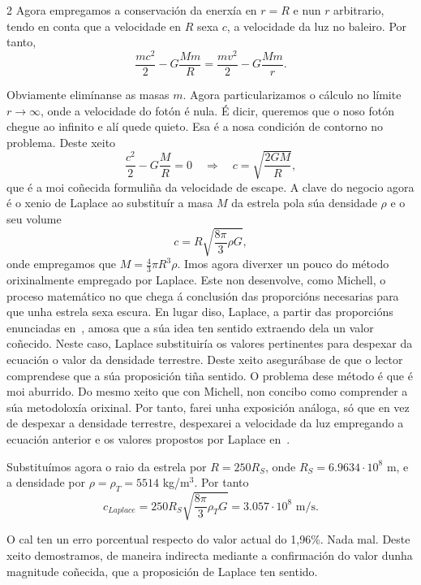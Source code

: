 \begin{multicols}{2}
Agora empregamos a conservación da enerxía en $r=R$ e nun $r$ arbitrario, tendo
en conta que a velocidade en $R$ sexa $c$, a velocidade da luz no baleiro. Por
tanto,
%
\begin{equation}
    \frac{mc^2}{2} - G\frac{Mm}{R} = \frac{mv^2}{2} - G\frac{Mm}{r}.
\end{equation}

Obviamente elimínanse as masas $m$. Agora particularizamos o cálculo no límite
$r\to\infty$, onde a velocidade do fotón é nula. É dicir, queremos que o noso
fotón chegue ao infinito e alí quede quieto. Esa é a nosa condición de contorno
no problema. Deste xeito
%
\begin{equation}
  \frac{c^2}{2} - G\frac{M}{R} = 0 \quad\Rightarrow\quad c = \sqrt{\frac{2GM}{R}},
\end{equation}
%
que é a moi coñecida formuliña da velocidade de escape. A clave do negocio
agora é o xenio de Laplace ao substituír a masa $M$ da estrela pola súa
densidade $\rho$ e o seu volume
%
\begin{equation}
  c = R\sqrt{\frac{8\pi}{3}\rho G},
\end{equation}
%
onde empregamos que $M = \frac{4}{3}\pi R^3 \rho$. Imos agora diverxer un pouco
do método orixinalmente empregado por Laplace. Este non desenvolve, como
Michell, o proceso matemático no que chega á conclusión das proporcións
necesarias para que unha estrela sexa escura. En lugar diso, Laplace, a partir
das proporcións enunciadas en~\cite{exposition_laplace}, amosa que a súa idea
ten sentido extraendo dela un valor coñecido. Neste caso, Laplace substituiría
os valores pertinentes para despexar da ecuación o valor da densidade
terrestre. Deste xeito asegurábase de que o lector comprendese que a súa
proposición tiña sentido. O problema dese método é que é moi aburrido. Do mesmo
xeito que con Michell, non concibo como comprender a súa metodoloxía orixinal.
Por tanto, farei unha exposición análoga, só que en vez de despexar a densidade
terrestre, despexarei a velocidade da luz empregando a ecuación anterior e os
valores propostos por Laplace en~\cite{exposition_laplace}.

Substituímos agora o raio da estrela por $R = 250 R_S$, onde $R_S = 6.9634\cdot
10^8$ m, e a densidade por $\rho = \rho_T = 5514$ kg/m$^3$. Por tanto
%
\begin{equation}
    c_{Laplace} = 250 R_S\sqrt{\frac{8\pi}{3}\rho_T G} = 3.057\cdot
    10^8 \text{ m/s}.
\end{equation}

O cal ten un erro porcentual respecto do valor actual do 1,96\%. Nada mal.
Deste xeito demostramos, de maneira indirecta mediante a confirmación do valor
dunha magnitude coñecida, que a proposición de Laplace ten sentido.


\end{multicols}
